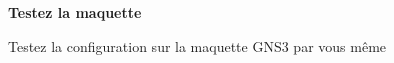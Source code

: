 \newcommand{\password}{[CACHÉ]}
\newcommand{\user}{[CACHÉ]}
\newcommand{\host}{[CACHÉ]}
\newcommand{\port}{[CACHÉ]}

\begin{center}
  \colorbox{PineGreen}{\begin{minipage}{10cm}
    \bigskip
    \sffamily
    \color{white}
    \hspace{5mm}\textbf{\Large Testez la maquette}\hspace{5mm}\par
    \medskip
    \hspace{5mm}\noindent Testez la configuration sur la maquette GNS3 par vous même\hspace{5mm}\par
    \hspace{5mm}\begin{description}
      \sffamily
      \item[\sffamily Hôte] \host
      \item[\sffamily Port] \port
      \item[\sffamily Utilisateur] \user
      \item[\sffamily Mot de passe] \password
    \end{description}\hspace{5mm}
  \medskip
  \end{minipage}}
\end{center}